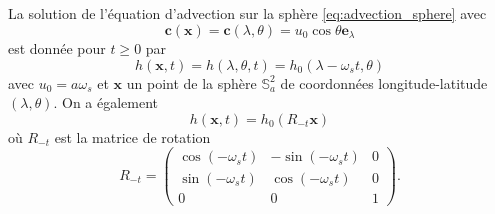 \begin{proposition}
La solution de l'équation d'advection sur la sphère \eqref{eq:advection_sphere} avec
\begin{equation}
\mathbf{c}(\mathbf{x}) = \mathbf{c}(\lambda,\theta) = u_0 \cos \theta \mathbf{e}_{\lambda}
\end{equation}
est donnée pour $t \geq 0$ par
\begin{equation}
h(\mathbf{x}, t ) = h(\lambda, \theta, t ) = h_0(\lambda- \omega_s t , \theta)
\end{equation}
avec $u_0 = a \omega_s$ et $\mathbf{x}$ un point de la sphère $\mathbb{S}_a^2$ de coordonnées longitude-latitude $(\lambda, \theta)$.
On a également
\begin{equation}
h(\mathbf{x},t) = h_0(R_{-t} \mathbf{x})
\end{equation}
où $R_{-t}$ est la matrice de rotation
\begin{equation}
R_{-t} = \begin{pmatrix}
\cos (- \omega_s t) & - \sin (- \omega_s t) & 0 \\
\sin (- \omega_s t) & \cos (- \omega_s t)   & 0 \\
0 & 0 & 1
\end{pmatrix} .
\end{equation}
\label{prop:rotsolide1}
\end{proposition}


